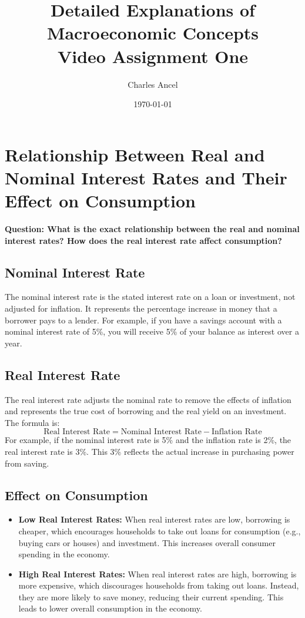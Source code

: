\documentclass{article}
\title{Detailed Explanations of Macroeconomic Concepts \\ \large Video Assignment One}
\author{Charles Ancel}
\date{\today}
\begin{document}
\maketitle

\section{Relationship Between Real and Nominal Interest Rates and Their Effect on Consumption}
\textbf{Question: What is the exact relationship between the real and nominal interest rates? How does the real interest rate affect consumption?}

\subsection{Nominal Interest Rate}
The nominal interest rate is the stated interest rate on a loan or investment, not adjusted for inflation. It represents the percentage increase in money that a borrower pays to a lender. For example, if you have a savings account with a nominal interest rate of 5\%, you will receive 5\% of your balance as interest over a year.

\subsection{Real Interest Rate}
The real interest rate adjusts the nominal rate to remove the effects of inflation and represents the true cost of borrowing and the real yield on an investment. The formula is:
\begin{equation}
\text{Real Interest Rate} = \text{Nominal Interest Rate} - \text{Inflation Rate}
\end{equation}
For example, if the nominal interest rate is 5\% and the inflation rate is 2\%, the real interest rate is 3\%. This 3\% reflects the actual increase in purchasing power from saving.

\subsection{Effect on Consumption}
\begin{itemize}
    \item \textbf{Low Real Interest Rates:} When real interest rates are low, borrowing is cheaper, which encourages households to take out loans for consumption (e.g., buying cars or houses) and investment. This increases overall consumer spending in the economy.
    \item \textbf{High Real Interest Rates:} When real interest rates are high, borrowing is more expensive, which discourages households from taking out loans. Instead, they are more likely to save money, reducing their current spending. This leads to lower overall consumption in the economy.
\end{itemize}
\end{document}
